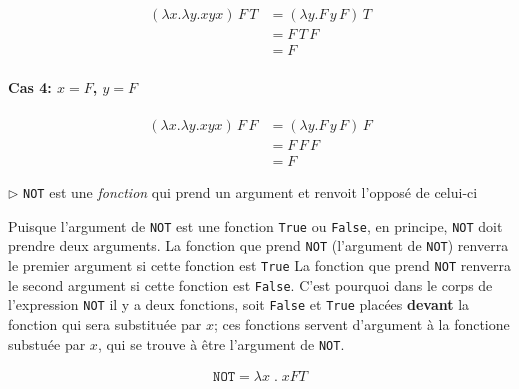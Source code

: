 \documentclass{report}
\begin{document}
\begin{multicols*}{3}
  \begin{align*}
  (\lambda x . \lambda y . x y x) \, F \, T &= (\lambda y . F \, y \, F) \, T \\
                                            &= F \, T \, F \\
                                            &= F
  \end{align*}

  \paragraph{Cas 4: \(x = F\), \(y = F\)}

  \begin{align*}
  (\lambda x . \lambda y . x y x) \, F \, F &= (\lambda y . F \, y \, F) \, F \\
                                            &= F \, F \, F \\
                                            &= F
  \end{align*}

  \mbox{} 
  \noindent 
  $\rhd$ \texttt{NOT} est une \textit{fonction} qui prend un argument 
  et renvoit l'opposé de celui-ci 

  \begin{note}{}{}
      Puisque l'argument de \texttt{NOT} est une fonction 
      \texttt{True} ou \texttt{False}, en principe, 
      \texttt{NOT} doit prendre deux arguments. 
      La fonction que prend \texttt{NOT} (l'argument de \texttt{NOT})
      renverra le premier argument si cette fonction est \texttt{True}
      La fonction que prend \texttt{NOT} renverra le second 
      argument si cette fonction est \texttt{False}. C'est pourquoi 
      dans le corps de l'expression \texttt{NOT} il y a deux fonctions, soit 
      \texttt{False} et \texttt{True} placées \textbf{devant} la fonction 
      qui sera substituée par $x$; ces fonctions servent d'argument 
      à la fonctione substuée par $x$, qui se trouve à être 
      l'argument de \texttt{NOT}.  
  \end{note}

  \begin{align*}
    \texttt{NOT} = \lambda x \; . \; x F T   
  \end{align*}



\end{multicols*}
\end{document}
